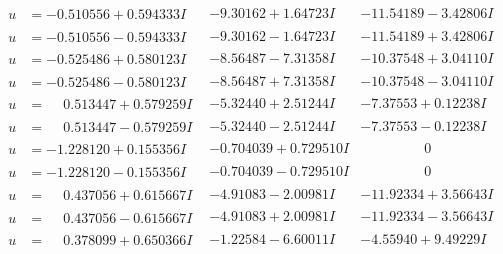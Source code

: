 \documentclass[1p]{elsarticle_modified}
\theoremstyle{definition}
\begin{document}
$$\begin{array}{c|c|c}
\begin{aligned}
u &= -0.510556 + 0.594333 I\end{aligned}
 & -9.30162 + 1.64723 I & -11.54189 - 3.42806 I \\ \hline\begin{aligned}
u &= -0.510556 - 0.594333 I\end{aligned}
 & -9.30162 - 1.64723 I & -11.54189 + 3.42806 I \\ \hline\begin{aligned}
u &= -0.525486 + 0.580123 I\end{aligned}
 & -8.56487 - 7.31358 I & -10.37548 + 3.04110 I \\ \hline\begin{aligned}
u &= -0.525486 - 0.580123 I\end{aligned}
 & -8.56487 + 7.31358 I & -10.37548 - 3.04110 I \\ \hline\begin{aligned}
u &= \phantom{-}0.513447 + 0.579259 I\end{aligned}
 & -5.32440 + 2.51244 I & -7.37553 + 0.12238 I \\ \hline\begin{aligned}
u &= \phantom{-}0.513447 - 0.579259 I\end{aligned}
 & -5.32440 - 2.51244 I & -7.37553 - 0.12238 I \\ \hline\begin{aligned}
u &= -1.228120 + 0.155356 I\end{aligned}
 & -0.704039 + 0.729510 I & \phantom{-0.000000 } 0 \\ \hline\begin{aligned}
u &= -1.228120 - 0.155356 I\end{aligned}
 & -0.704039 - 0.729510 I & \phantom{-0.000000 } 0 \\ \hline\begin{aligned}
u &= \phantom{-}0.437056 + 0.615667 I\end{aligned}
 & -4.91083 - 2.00981 I & -11.92334 + 3.56643 I \\ \hline\begin{aligned}
u &= \phantom{-}0.437056 - 0.615667 I\end{aligned}
 & -4.91083 + 2.00981 I & -11.92334 - 3.56643 I \\ \hline\begin{aligned}
u &= \phantom{-}0.378099 + 0.650366 I\end{aligned}
 & -1.22584 - 6.60011 I & -4.55940 + 9.49229 I \\ \hline\begin{aligned}

\end{aligned}
\end{array}$$
\end{document}
